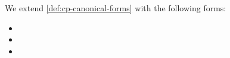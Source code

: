 \begin{definition}\label{def:nc-canonical-forms}
  We extend \cref{def:cp-canonical-forms} with the following forms:
  \begin{itemize}[noitemsep,topsep=0pt,parsep=0pt,partopsep=0pt]
  \item {}
  \item {}
  \item {}
  \end{itemize}
\end{definition}
